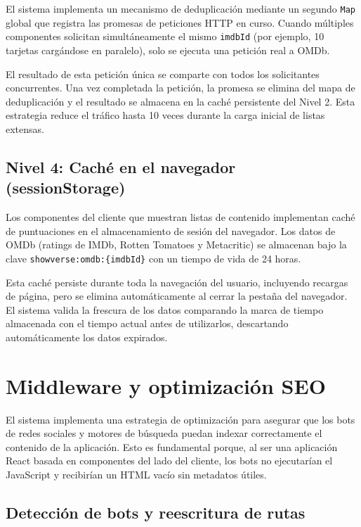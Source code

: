 El sistema implementa un mecanismo de deduplicación mediante un segundo \texttt{Map} global que registra las promesas de peticiones HTTP en curso. Cuando múltiples componentes solicitan simultáneamente el mismo \texttt{imdbId} (por ejemplo, 10 tarjetas cargándose en paralelo), solo se ejecuta una petición real a OMDb.

El resultado de esta petición única se comparte con todos los solicitantes concurrentes. Una vez completada la petición, la promesa se elimina del mapa de deduplicación y el resultado se almacena en la caché persistente del Nivel 2. Esta estrategia reduce el tráfico hasta 10 veces durante la carga inicial de listas extensas.

\subsection{Nivel 4: Caché en el navegador (sessionStorage)}

Los componentes del cliente que muestran listas de contenido implementan caché de puntuaciones en el almacenamiento de sesión del navegador. Los datos de OMDb (ratings de IMDb, Rotten Tomatoes y Metacritic) se almacenan bajo la clave \texttt{showverse:omdb:\{imdbId\}} con un tiempo de vida de 24 horas.

Esta caché persiste durante toda la navegación del usuario, incluyendo recargas de página, pero se elimina automáticamente al cerrar la pestaña del navegador. El sistema valida la frescura de los datos comparando la marca de tiempo almacenada con el tiempo actual antes de utilizarlos, descartando automáticamente los datos expirados.

\section{Middleware y optimización SEO}

El sistema implementa una estrategia de optimización para asegurar que los bots de redes sociales y motores de búsqueda puedan indexar correctamente el contenido de la aplicación. Esto es fundamental porque, al ser una aplicación React basada en componentes del lado del cliente, los bots no ejecutarían el JavaScript y recibirían un HTML vacío sin metadatos útiles.

\subsection{Detección de bots y reescritura de rutas}

